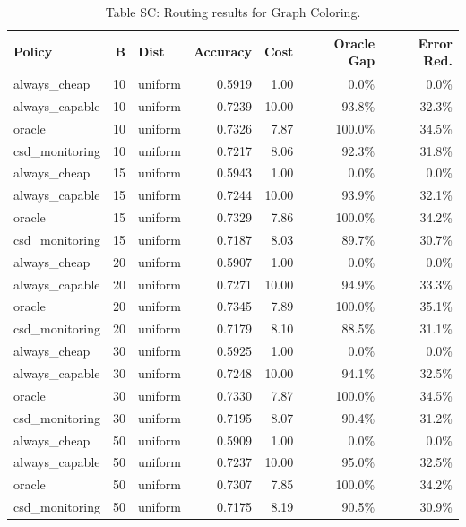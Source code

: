 \documentclass[11pt]{article}
\begin{document}
\begin{table}[h]\centering\scriptsize
\caption{Table S{C}: Routing results for Graph Coloring.}
\begin{tabular}{l|r|l|r|r|r|r}
\toprule
Policy & B & Dist & Accuracy & Cost & Oracle Gap & Error Red. \\
\midrule
always\_cheap & 10 & uniform & 0.5919 & 1.00 & 0.0\% & 0.0\% \\
\midrule
always\_capable & 10 & uniform & 0.7239 & 10.00 & 93.8\% & 32.3\% \\
\midrule
oracle & 10 & uniform & 0.7326 & 7.87 & 100.0\% & 34.5\% \\
\midrule
csd\_monitoring & 10 & uniform & 0.7217 & 8.06 & 92.3\% & 31.8\% \\
\midrule
always\_cheap & 15 & uniform & 0.5943 & 1.00 & 0.0\% & 0.0\% \\
\midrule
always\_capable & 15 & uniform & 0.7244 & 10.00 & 93.9\% & 32.1\% \\
\midrule
oracle & 15 & uniform & 0.7329 & 7.86 & 100.0\% & 34.2\% \\
\midrule
csd\_monitoring & 15 & uniform & 0.7187 & 8.03 & 89.7\% & 30.7\% \\
\midrule
always\_cheap & 20 & uniform & 0.5907 & 1.00 & 0.0\% & 0.0\% \\
\midrule
always\_capable & 20 & uniform & 0.7271 & 10.00 & 94.9\% & 33.3\% \\
\midrule
oracle & 20 & uniform & 0.7345 & 7.89 & 100.0\% & 35.1\% \\
\midrule
csd\_monitoring & 20 & uniform & 0.7179 & 8.10 & 88.5\% & 31.1\% \\
\midrule
always\_cheap & 30 & uniform & 0.5925 & 1.00 & 0.0\% & 0.0\% \\
\midrule
always\_capable & 30 & uniform & 0.7248 & 10.00 & 94.1\% & 32.5\% \\
\midrule
oracle & 30 & uniform & 0.7330 & 7.87 & 100.0\% & 34.5\% \\
\midrule
csd\_monitoring & 30 & uniform & 0.7195 & 8.07 & 90.4\% & 31.2\% \\
\midrule
always\_cheap & 50 & uniform & 0.5909 & 1.00 & 0.0\% & 0.0\% \\
\midrule
always\_capable & 50 & uniform & 0.7237 & 10.00 & 95.0\% & 32.5\% \\
\midrule
oracle & 50 & uniform & 0.7307 & 7.85 & 100.0\% & 34.2\% \\
\midrule
csd\_monitoring & 50 & uniform & 0.7175 & 8.19 & 90.5\% & 30.9\% \\

\end{tabular}
\end{table}
\end{document}
